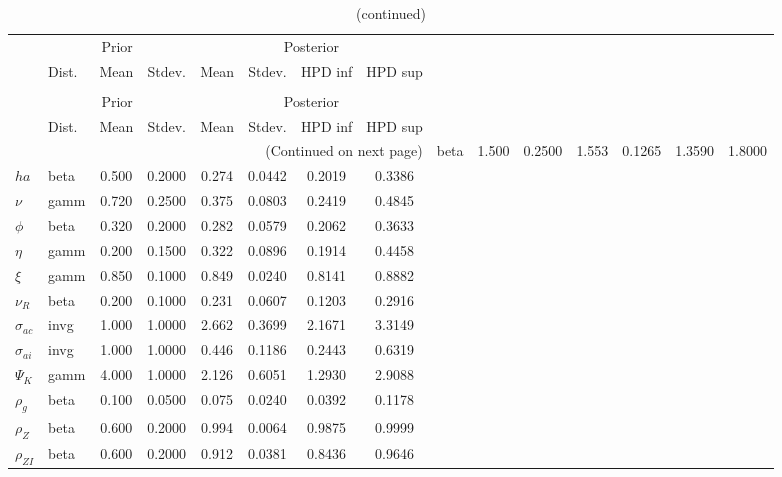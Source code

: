  
\begin{center}
\begin{longtable}{llcccccc} 
\caption{Results from Metropolis-Hastings (parameters)}
 \label{Table:MHPosterior:1}\\
\toprule 
  & \multicolumn{3}{c}{Prior}  &  \multicolumn{4}{c}{Posterior} \\
  \cmidrule(r{.75em}){2-4} \cmidrule(r{.75em}){5-8}
  & Dist. & Mean  & Stdev. & Mean & Stdev. & HPD inf & HPD sup\\
\midrule \endfirsthead 
\caption{(continued)}\\\toprule 
  & \multicolumn{3}{c}{Prior}  &  \multicolumn{4}{c}{Posterior} \\
  \cmidrule(r{.75em}){2-4} \cmidrule(r{.75em}){5-8}
  & Dist. & Mean  & Stdev. & Mean & Stdev. & HPD inf & HPD sup\\
\midrule \endhead 
\bottomrule \multicolumn{8}{r}{(Continued on next page)} \endfoot 
\bottomrule \endlastfoot 
${\sigma}$ & beta &   1.500 & 0.2500 &   1.553& 0.1265 &  1.3590 &  1.8000 \\ 
${ha}$ & beta &   0.500 & 0.2000 &   0.274& 0.0442 &  0.2019 &  0.3386 \\ 
$\nu$ & gamm &   0.720 & 0.2500 &   0.375& 0.0803 &  0.2419 &  0.4845 \\ 
${\phi}$ & beta &   0.320 & 0.2000 &   0.282& 0.0579 &  0.2062 &  0.3633 \\ 
${\eta}$ & gamm &   0.200 & 0.1500 &   0.322& 0.0896 &  0.1914 &  0.4458 \\ 
$\xi$ & gamm &   0.850 & 0.1000 &   0.849& 0.0240 &  0.8141 &  0.8882 \\ 
${\nu_R}$ & beta &   0.200 & 0.1000 &   0.231& 0.0607 &  0.1203 &  0.2916 \\ 
${\sigma_{ac}}$ & invg &   1.000 & 1.0000 &   2.662& 0.3699 &  2.1671 &  3.3149 \\ 
${\sigma_{ai}}$ & invg &   1.000 & 1.0000 &   0.446& 0.1186 &  0.2443 &  0.6319 \\ 
${\Psi_{K}}$ & gamm &   4.000 & 1.0000 &   2.126& 0.6051 &  1.2930 &  2.9088 \\ 
${\rho_g}$ & beta &   0.100 & 0.0500 &   0.075& 0.0240 &  0.0392 &  0.1178 \\ 
${\rho_Z}$ & beta &   0.600 & 0.2000 &   0.994& 0.0064 &  0.9875 &  0.9999 \\ 
${\rho_{ZI}}$ & beta &   0.600 & 0.2000 &   0.912& 0.0381 &  0.8436 &  0.9646 \\ 

\end{longtable}
\end{center}
